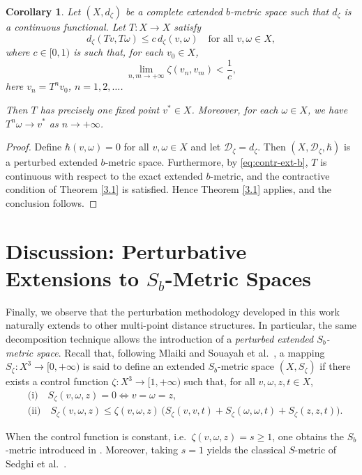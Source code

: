 \documentclass[sn-mathphys-num]{sn-jnl}%
\theoremstyle{thmstyleone}%
\theoremstyle{thmstyletwo}%
\theoremstyle{thmstylethree}%
\newtheorem{corollary}{Corollary}
\numberwithin{equation}{section}
\begin{document}
\begin{corollary} \cite{kamran}
Let $(X,d_{\zeta})$ be a complete extended $b$-metric space such that 
$d_{\zeta}$ is a continuous functional. 
Let $T : X \to X$ satisfy
\begin{equation}\label{eq:contr-ext-b}
d_{\zeta}(Tv, T\omega) \le c\, d_{\zeta}(v, \omega)
\quad \text{for all } v, \omega \in X,
\end{equation}
where $c \in [0,1)$ is such that, for each $v_{0} \in X$,
\[
\lim_{n,m \to +\infty} \zeta(v_n, v_m) < \frac{1}{c},
\]
here $v_n = T^{n} v_0$, $n = 1,2,\dots$.

Then $T$ has precisely one fixed point $v^{\ast} \in X$. Moreover, for each 
$\omega \in X$, we have $T^{n}\omega \to v^{\ast}$ as $n \to +\infty$.
\end{corollary}
\begin{proof}
Define 
$\hbar(v,\omega) = 0$ for all $v,\omega \in X$ and let $\mathcal{D}_{\zeta} = d_{\zeta}$. Then 
$(X,\mathcal{D}_{\zeta},\hbar)$ is a perturbed extended $b$-metric space. 
Furthermore, by \eqref{eq:contr-ext-b}, $T$ is continuous with respect to the 
exact extended $b$-metric, and the contractive condition 
of Theorem \ref{3.1} is satisfied. Hence Theorem \ref{3.1} applies, and the conclusion follows.
\end{proof}
\section{Discussion: Perturbative Extensions to $S_b$-Metric Spaces}
Finally, we observe that the perturbation methodology developed in this work 
naturally extends to other multi-point distance structures. In particular, the 
same decomposition technique allows the introduction of a \emph{perturbed 
extended $S_{b}$-metric space}. Recall that, following Mlaiki \cite{Mlaiki} and 
Souayah et al.\ \cite{Souayah}, a mapping $S_{\zeta}:X^{3}\to[0,+\infty)$ is 
said to define an extended $S_{b}$-metric space $(X,S_{\zeta})$ if there exists 
a control function $\zeta:X^{3}\to[1,+\infty)$ such that, for all 
$v,\omega,z,t\in X$,
\[
\begin{aligned}
&\text{(i)}\quad S_{\zeta}(v,\omega,z)=0 \iff v=\omega=z,\\[1mm]
&\text{(ii)}\quad 
S_{\zeta}(v,\omega,z)
   \le 
\zeta(v,\omega,z)\,\big(
    S_{\zeta}(v,v,t)
  + S_{\zeta}(\omega,\omega,t)
  + S_{\zeta}(z,z,t)
\big).
\end{aligned}
\]

When the control function is constant, i.e.\ $\zeta(v,\omega,z)=s\ge 1$, one 
obtains the $S_{b}$-metric introduced in \cite{Mlaiki,Souayah}. Moreover, taking 
$s=1$ yields the classical $S$-metric of Sedghi et al.\ \cite{Sedghi}.
\end{document}
